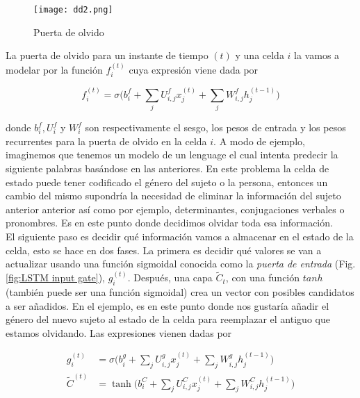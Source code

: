	    
	    \begin{figure}[H]
	      \centering
	      \texttt{[image: dd2.png]}
	      \caption{Puerta de olvido}
	      \label{fig:dd2}
	    \end{figure}
	    
	 La puerta de olvido para un instante de tiempo $(t)$ y una celda $i$ la vamos a modelar por la función $f_i^{(t)}$ cuya expresión viene dada por
	 
	 \begin{equation}\label{eq:lstm_f}
	     f^{(t)}_i = \sigma \Big( b^f_i + \sum_j U_{i,j}^f x^{(t)}_j + \sum_j W_{i,j}^f h^{(t-1)}_j \Big)
	 \end{equation}
	    
	\noindent donde $b_i^f, U_i^f$ y $W_i^f$ son respectivamente el sesgo, los pesos de entrada y los pesos recurrentes para la puerta de olvido en la celda $i$. A modo de ejemplo, imaginemos que tenemos un modelo de un lenguage el cual intenta predecir la siguiente palabras basándose en las anteriores. En este problema la celda de estado puede tener codificado el género del sujeto o la persona, entonces un cambio del mismo supondría la necesidad de eliminar la información del sujeto anterior anterior así como por ejemplo, determinantes, conjugaciones verbales o pronombres. Es en este punto donde decidimos olvidar toda esa información. \\
	  
    El siguiente paso es decidir qué información vamos a almacenar en el estado de la celda, esto se hace en dos fases. La primera es decidir qué valores se van a actualizar usando una función sigmoidal conocida como la \textit{puerta de entrada} (Fig. \ref{fig:LSTM input gate}), $g_i^{(t)}$. Después, una capa $\tilde{C}_t$, con una función $tanh$ (también puede ser una función sigmoidal) crea un vector con posibles candidatos a ser añadidos. En el ejemplo, es en este punto donde nos gustaría añadir el género del nuevo sujeto al estado de la celda para reemplazar el antiguo que estamos olvidando. Las expresiones vienen dadas por
    
    \begin{equation}
    \begin{aligned}
        g^{(t)}_i & = \sigma \Big( b^g_i + \sum_j U_{i,j}^g x^{(t)}_j + \sum_j W_{i,j}^g h^{(t-1)}_j \Big) \\
        \tilde{C}^{(t)} & = \tanh \Big( b^C_i + \sum_j U^C_{i,j}x^{(t)}_j + \sum_j W^C_{i,j} h^{(t-1)}_j \Big)
    \end{aligned}
    \end{equation}
    
